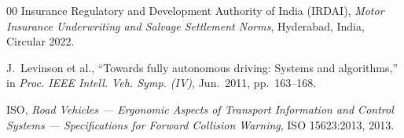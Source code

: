 \documentclass[journal,compsoc]{IEEEtran}
\begin{document}
\begin{thebibliography}{00}
Insurance Regulatory and Development Authority of India (IRDAI), \textit{Motor Insurance Underwriting and Salvage Settlement Norms}, Hyderabad, India, Circular 2022.

J.~Levinson et al., ``Towards fully autonomous driving: Systems and algorithms,'' in \textit{Proc. IEEE Intell. Veh. Symp. (IV)}, Jun.~2011, pp.~163--168.

ISO, \textit{Road Vehicles --- Ergonomic Aspects of Transport Information and Control Systems --- Specifications for Forward Collision Warning}, ISO 15623:2013, 2013.

\end{thebibliography}
\end{document}
